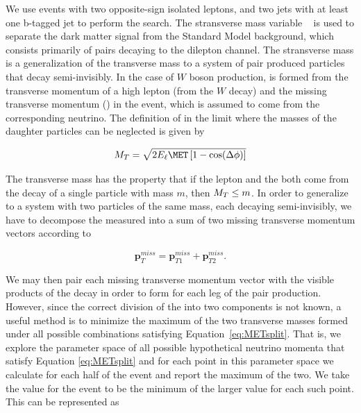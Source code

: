   We use events with two opposite-sign isolated leptons, and two jets with at least one b-tagged jet to perform the search. The stransverse
  mass variable \mtll~\cite{Lester:1999tx} is used to separate the dark matter signal from the Standard Model background, which consists primarily of \ttbar pairs decaying to the dilepton channel.
  The stransverse mass is a generalization of the transverse mass \mt to a system of pair produced particles that decay semi-invisibly. 
  In the case of $W$ boson production, \mt is formed from the transverse momentum of a high \pt lepton (from the $W$ decay) and the missing transverse momentum (\met) in the event, 
  which is assumed to come from the corresponding neutrino. The definition of \mt in the limit where the masses of the daughter particles can be neglected is given by

  \begin{equation}
    \label{eq:mt}
    \mt = \sqrt{2 E_\ell \met \left[1 - \cos(\Delta\phi)\right]}
  \end{equation}

  The transverse mass has the property that if the lepton and the \met both come from the decay of a
  single particle with mass $m$, then $M_{T} \leq m$. In order to generalize to a system with two particles
  of the same mass, each decaying semi-invisibly, we have to decompose the measured \met into
  a sum of two missing transverse momentum vectors according to %
 
  \begin{equation}
    \label{eq:METsplit}
    \mathbf{p}_T^{miss} = \mathbf{p}_{T1}^{miss} + \mathbf{p}_{T2}^{miss}.
  \end{equation}

  We may then pair each missing transverse momentum vector with the visible products of the
  decay in order to form \mt for each leg of the pair production. However, since the correct division of the \met into two components is not known, 
  a useful method is to minimize the maximum of the two transverse masses formed under all possible combinations satisfying Equation~\ref{eq:METsplit}. 
  That is, we explore the parameter space of all possible hypothetical neutrino momenta
  that satisfy Equation \ref{eq:METsplit} and for each point in this parameter space we calculate \mt for each half
  of the event and report the maximum of the two. We take the \mtll value for the event to be the
  minimum of the larger \mt value for each such point. This can be represented as %

